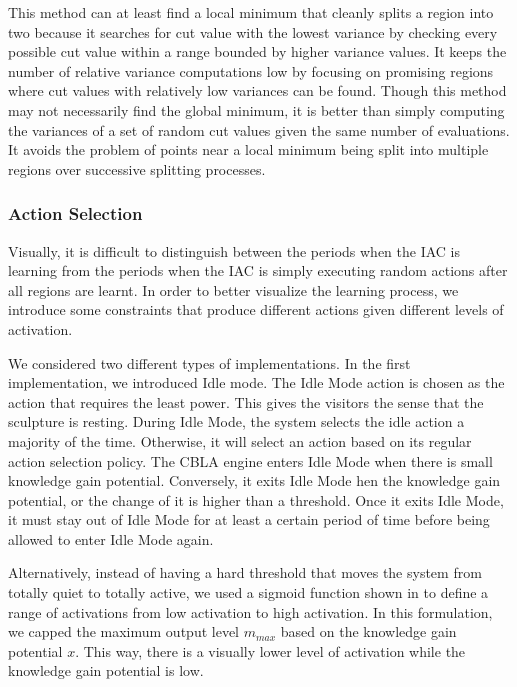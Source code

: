 This method can at least find a local minimum that cleanly splits a region into two because it searches for cut value with the lowest variance by checking every possible cut value within a range bounded by higher variance values. It keeps the number of relative variance computations low by focusing on promising regions where cut values with relatively low variances can be found. Though this method may not necessarily find the global minimum, it is better than simply computing the variances of a set of random cut values given the same number of evaluations. It avoids the problem of points near a local minimum being split into multiple regions over successive splitting processes. 

\FloatBarrier 
\subsubsection{Action Selection}\label{sec:action_selection}

Visually, it is difficult to distinguish between the periods when the IAC is learning from the periods when the IAC is simply executing random actions after all regions are learnt. In order to better visualize the learning process, we introduce some constraints that produce different actions given different levels of activation. 

We considered two different types of implementations. In the first implementation, we introduced Idle mode. The Idle Mode action is chosen as the action that requires the least power. This gives the visitors the sense that the sculpture is resting. During Idle Mode, the system selects the idle action a majority of the time. Otherwise, it will select an action based on its regular action selection policy. The CBLA engine enters Idle Mode when there is small knowledge gain potential. Conversely, it exits Idle Mode hen the knowledge gain potential, or the change of it is higher than a threshold. Once it exits Idle Mode, it must stay out of Idle Mode for at least a certain period of time before being allowed to enter Idle Mode again. 

Alternatively, instead of having a hard threshold that moves the system from totally quiet to totally active, we used a sigmoid function shown in  to define a range of activations from low activation to high activation. In this formulation, we capped the maximum output level $m_{max}$ based on the knowledge gain potential $x$. This way, there is a visually lower level of activation while the knowledge gain potential is low. 

